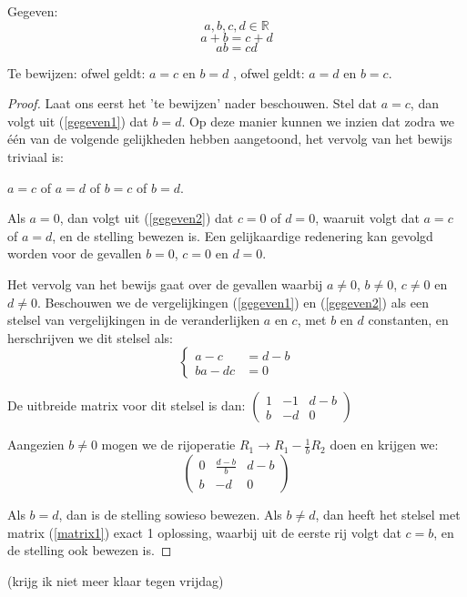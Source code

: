 \documentclass[hidequestions]{homework}
\begin{document}



Gegeven:
\[a, b, c, d \in \mathbb{R}\] 
\begin{equation}\label{gegeven1}a + b = c + d\end{equation}
\begin{equation}\label{gegeven2}ab = cd\end{equation}

Te bewijzen: 
ofwel geldt: \(a=c\) en \(b=d\) , ofwel geldt: \(a=d\) en \(b=c\). 


\begin{proof}
Laat ons eerst het 'te bewijzen' nader beschouwen. 
Stel dat \(a=c\), dan volgt uit (\ref{gegeven1}) dat \(b=d\). Op deze manier kunnen we inzien dat zodra we \'{e}\'{e}n van de volgende gelijkheden hebben aangetoond, het vervolg van het bewijs triviaal is: 

\(a=c\) of \(a=d\) of \(b=c\) of \(b=d\). 


Als \(a = 0\), dan volgt uit (\ref{gegeven2}) dat \(c = 0\) of  \(d = 0\), waaruit volgt dat \(a = c\) of \(a = d\), en de stelling bewezen is. Een gelijkaardige redenering kan gevolgd worden voor de gevallen \(b = 0\), \(c = 0\) en \(d = 0\). 

Het vervolg van het bewijs gaat over de gevallen waarbij  \(a \neq 0\),  \(b \neq 0\),  \(c \neq 0\) en  \(d \neq 0\). Beschouwen we de vergelijkingen (\ref{gegeven1}) en (\ref{gegeven2}) als een stelsel van vergelijkingen in de veranderlijken \(a\) en \(c\), met \(b\) en \(d\) constanten, en herschrijven we dit stelsel als: 
\[\left\{ 
\begin{aligned}
a-c &= d-b\\
ba -dc &= 0 
\end{aligned} 
\right.\]

De uitbreide matrix voor dit stelsel is dan: 
$\begin{pmatrix}
1 & -1 & d-b\\
b & -d & 0
\end{pmatrix}$

Aangezien \(b \neq 0\) mogen we de rijoperatie $R_1 \longrightarrow R_1 - \frac{1}{b}R_2$ doen en krijgen we: 
\begin{equation}\label{matrix1}
\begin{pmatrix}
0 & \frac{d-b}{b} & d-b\\
b & -d & 0
\end{pmatrix}
\end{equation}

Als \(b=d\), dan is de stelling sowieso bewezen. Als \(b \neq d\), dan heeft het stelsel met matrix (\ref{matrix1}) exact 1 oplossing, waarbij uit de eerste rij volgt dat \(c=b\), en de stelling ook bewezen is. 

\end{proof}

\problem
(krijg ik niet meer klaar tegen vrijdag)
\end{document}
